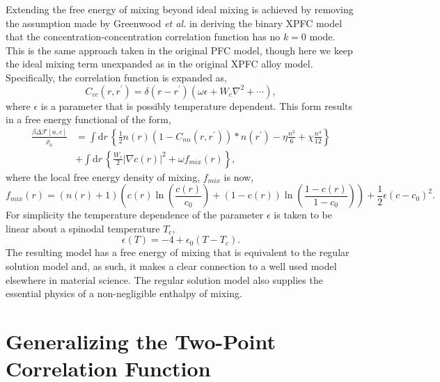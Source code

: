 \documentclass[showkeys, prb, reprint]{revtex4-1}
\renewcommand{\d}{\delta}       %
\newcommand{\F}{\mathcal{F}}    %
\renewcommand{\l}{\left}        %
\renewcommand{\r}{\right}       %
\newcommand{\f}{\frac}          %
\newcommand{\integrate}[1]{\int \mathrm{d}#1\,}
\begin{document}
Extending the free energy of mixing beyond ideal mixing is achieved by removing
the assumption made by Greenwood \textit{et al.} in deriving the binary XPFC
model that the concentration-concentration correlation function has no $k=0$
mode. This is the same approach taken in the original PFC model, though here we
keep the ideal mixing term unexpanded as in the original XPFC alloy model.
Specifically, the correlation function is expanded as,
%
\begin{equation}
    C_{cc}(r, r^\prime) = \d(r - r^\prime)
        \l(\omega\epsilon + W_c\nabla^2 + \cdots\r),
\end{equation}
%
where $\epsilon$ is a parameter that is possibly temperature dependent. This
form results in a free energy functional of the form,
%
\begin{align}
    \f{\beta\Delta\F[n, c]}{\rho_0} &= \integrate{r} \l\lbrace
        \f{1}{2} n(r) \l(1 - C_{nn}(r, r^\prime)\r) \ast n(r^\prime)
        - \eta \f{n^3}{6} + \chi \f{n^4}{12} \r\rbrace \\
        &+ \integrate{r}\l\lbrace
            \f{W_c}{2}\l\vert \nabla c(r) \r\vert^2 + \omega f_{mix}(r)
            \r\rbrace, \nonumber
\end{align}
%
where the local free energy density of mixing, $f_{mix}$ is now,
%
\begin{equation}
    f_{mix}(r) = \l(n(r) + 1\r)\l(
            c(r)\ln\l(\f{c(r)}{c_0}\r)
          + (1-c(r))\ln\l(\f{1-c(r)}{1-c_0}\r) \r)
          + \f{1}{2} \epsilon (c - c_0)^2.
\end{equation}
%
For simplicity the temperature dependence of the parameter $\epsilon$ is taken
to be linear about a spinodal temperature $T_c$,
%
\begin{equation}
    \label{eq:spinodal_model}
    \epsilon(T) = -4 + \epsilon_0(T - T_c).
\end{equation}
%
The resulting model has a free energy of mixing that is equivalent to the
regular solution model and, as such, it makes a clear connection to a well used
model elsewhere in material science. The regular solution model also supplies
the essential physics of a non-negligible enthalpy of mixing. 

\section{Generalizing the Two-Point Correlation Function} %
\end{document}
